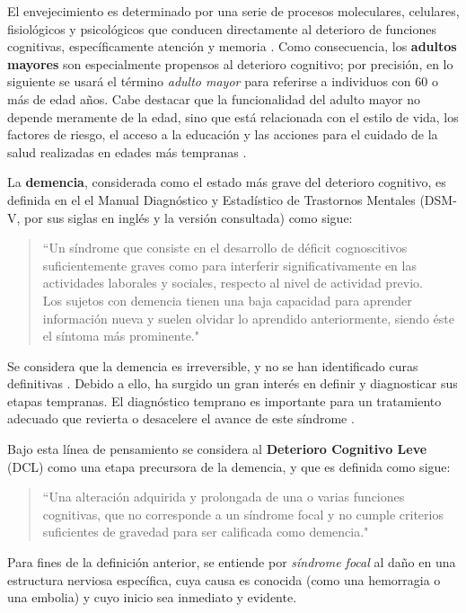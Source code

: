 \documentclass[12pt,letterpaper]{book}
\begin{document}
El envejecimiento es determinado por una serie de procesos moleculares, celulares, fisiológicos y psicológicos que conducen directamente al deterioro de funciones cognitivas, específicamente atención y memoria \cite{Park09}.
%
Como consecuencia, los \textbf{adultos mayores} son especialmente propensos al deterioro cognitivo; por precisión, en lo siguiente se usará el término \textit{adulto mayor} para referirse a individuos con 60 o más de edad años.
%
Cabe destacar que la funcionalidad del adulto mayor no depende meramente de la edad, sino que está relacionada con el estilo de vida, los factores de riesgo, el acceso a la educación y las acciones para el cuidado de la salud realizadas en edades más tempranas \cite{Sanhueza14}.
 
La \textbf{demencia}, considerada como el estado más grave del deterioro cognitivo, es definida en el el Manual Diagnóstico y Estadístico de Trastornos Mentales (DSM-V, por sus siglas en inglés y la versión consultada) como sigue:
\begin{quote}
``Un síndrome que consiste en el desarrollo de déficit cognoscitivos suficientemente graves como para 
interferir significativamente en las actividades laborales y sociales, respecto al nivel de 
actividad previo.\\
%
Los sujetos con demencia tienen una baja capacidad para aprender información nueva y suelen olvidar 
lo aprendido anteriormente, siendo éste el síntoma más prominente."  \cite{DCM5}
\end{quote}

Se considera que la demencia es irreversible, y no se han identificado curas definitivas \cite{PlanAlzheimer04}. 
%
Debido a ello, ha surgido un gran interés en definir y diagnosticar sus etapas tempranas. 
%
El diagnóstico temprano es importante para un tratamiento adecuado que revierta o desacelere el avance de este síndrome \cite{Knopman01}.

Bajo esta línea de pensamiento se considera al \textbf{Deterioro Cognitivo Leve} (DCL) como una etapa precursora de la demencia, y que es definida como sigue: 
\begin{quote}
``Una alteración adquirida y prolongada de una o varias funciones cognitivas, que no corresponde a un 
síndrome focal y no cumple criterios suficientes de gravedad para ser calificada como demencia."
\cite{Robles02}
\end{quote}

Para fines de la definición anterior, se entiende por \textit{síndrome focal} al daño en una estructura nerviosa específica, cuya causa es conocida (como una hemorragia o una embolia) y cuyo inicio sea inmediato y evidente. 
\end{document}
